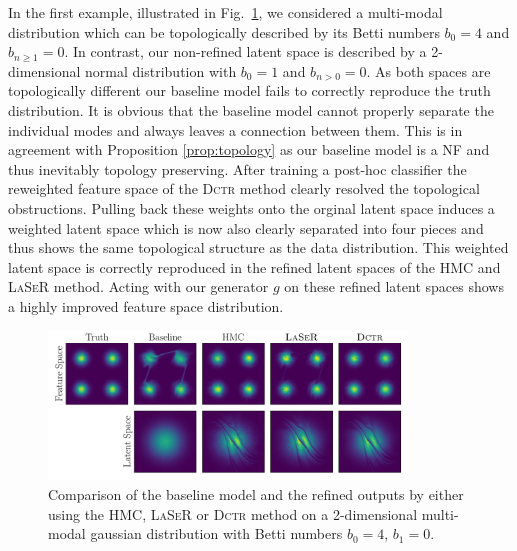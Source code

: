 In the first example, illustrated in Fig.~\ref{fig:gaussians}, we considered a multi-modal distribution which can be topologically described by its Betti numbers $b_0=4$ and $b_{n\ge1}=0$. In contrast, our non-refined latent space is described by a 2-dimensional normal distribution with $b_0=1$ and $b_{n>0}=0$. As both spaces are topologically different our baseline model fails to correctly reproduce the truth distribution. It is obvious that the baseline model cannot properly separate the individual modes and always leaves a connection between them. This is in agreement with Proposition \ref{prop:topology} as our baseline model is a NF and thus inevitably topology preserving.
After training a post-hoc classifier the reweighted feature space of the \textsc{Dctr} method clearly resolved the topological obstructions. Pulling back these weights onto the orginal latent space induces a weighted latent space which is now also clearly separated into four pieces and thus shows the same topological structure as the data distribution. This weighted latent space is correctly reproduced in the refined latent spaces of the HMC and \textsc{LaSeR} method. Acting with our generator $g$ on these refined latent spaces shows a highly improved feature space distribution.
%
\begin{figure}[!htbp]
    \centering
    \includegraphics[width=0.85\textwidth]{./figures/LSR/4_gaussians.pdf}
  \caption{Comparison of the baseline model and the refined outputs by either using the HMC, \textsc{LaSeR} or \textsc{Dctr} method on a 2-dimensional multi-modal gaussian distribution with Betti numbers $b_0=4$, $b_1=0$.}
  \label{fig:gaussians}
\end{figure}
%

